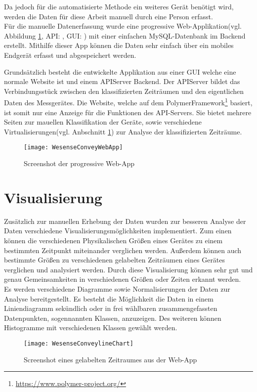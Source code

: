         Da jedoch für die automatisierte Methode ein weiteres Gerät benötigt wird, werden die Daten für diese Arbeit manuell durch eine Person erfasst.\\
        \newline
        Für die manuelle Datenerfassung wurde eine progressive Web-Applikation(vgl. Abbildung \ref{fig:WebApp1}, API: \cite{WesenseAPIRepo}, GUI: \cite{WesenseGUIRepo}) mit einer einfachen MySQL-Datenbank im Backend erstellt.
        Mithilfe dieser App können die Daten sehr einfach über ein mobiles Endgerät erfasst und abgespeichert werden.
        \newline

        Grundsätzlich besteht die entwickelte Applikation aus einer GUI welche eine normale Website ist und einem API\-Server Backend.
        Der API\-Server bildet das Verbindungsstück zwischen den klassifizierten Zeiträumen und den eigentlichen Daten des Messgerätes.
        Die Website, welche auf dem Polymer\-Framework\footnote{\url{https://www.polymer-project.org/}} basiert, ist somit nur eine Anzeige für die Funktionen des API-Servers.
        Sie bietet mehrere Seiten zur mauellen Klassifikation der Geräte, sowie verschiedene Virtualisierungen(vgl. Anbschnitt \ref{VisualisierungWebApp}) zur Analyse der klassifizierten Zeiträume.

        \begin{figure}[h]
            \centering
            \texttt{[image: WesenseConveyWebApp]}
            \caption{Screenshot der progressive Web-App}
            \label{fig:WebApp1}
        \end{figure}

\section{Visualisierung}\label{VisualisierungWebApp}

        Zusätzlich zur manuellen Erhebung der Daten wurden zur besseren Analyse der Daten verschiedene Visualisierungsmöglichkeiten implementiert.
        Zum einen können die verschiedenen Physikalischen Größen eines Gerätes zu einem bestimmten Zeitpunkt miteinander verglichen werden.
        Außerdem können auch bestimmte Größen zu verschiedenen gelabelten Zeiträumen eines Gerätes verglichen und analysiert werden. 
        Durch diese Visualisierung können sehr gut und genau Gemeinsamkeiten in verschiedenen Größen oder Zeiten erkannt werden.\\
        \newline
        Es werden verschiedene Diagramme sowie Normalisierungen der Daten zur Analyse bereitgestellt.
        Es besteht die Möglichkeit die Daten in einem Liniendiagramm sekündlich oder in frei wählbaren zusammengefassten Datenpunkten, sogennannten Klassen, anzuzeigen.
        Des weiteren können Histogramme mit verschiedenen Klassen gewählt werden.

        \begin{figure}[h]
            \centering
            \texttt{[image: WesenseConveylineChart]}
            \caption{Screenshot eines gelabelten Zeitraumes aus der Web-App}
            \label{fig:WebApp2}
        \end{figure}
